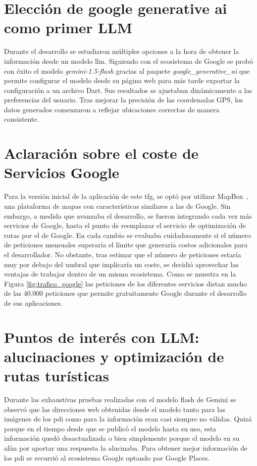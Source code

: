 \section{Elección de google generative ai como primer LLM}
Durante el desarrollo se estudiaron múltiples opciones a la hora de obtener la información desde un modelo \acrshort{llm}. 
Siguiendo con el ecosistema de Google se probó con éxito el modelo \textit{gemini-1.5-flash} gracias al paquete \textit{google\_generative\_ai} que permite configurar el modelo desde su página web para más tarde exportar la configuración a un archivo Dart. Sus resultados se ajustaban dinámicamente a las preferencias del usuario. Tras mejorar la precisión de las coordenadas GPS, los datos generados comenzaron a reflejar ubicaciones correctas de manera consistente.
\

\section{Aclaración sobre el coste de Servicios Google}
Para la versión inicial de la aplicación de este \acrshort{tfg}, se optó por utilizar MapBox~\cite{mapbox}, una plataforma de mapas con características similares a las de Google. Sin embargo, a medida que avanzaba el desarrollo, se fueron integrando cada vez más servicios de Google, hasta el punto de reemplazar el servicio de optimización de rutas por el de Google. En cada cambio se evaluaba cuidadosamente si el número de peticiones mensuales superaría el límite que generaría costos adicionales para el desarrollador. No obstante, tras estimar que el número de peticiones estaría muy por debajo del umbral que implicaría un coste, se decidió aprovechar las ventajas de trabajar dentro de un mismo ecosistema. Como se muestra en la Figura \ref{fig:trafico_google} las peticiones de los diferentes servicios distan mucho de las 40.000 peticiones que permite gratuitamente Google durante el desarrollo de sus aplicaciones.
  
\section{Puntos de interés con LLM: alucinaciones y optimización de rutas turísticas}
Durante las exhaustivas pruebas realizadas con el modelo flash de Gemini se observó que las direcciones web obtenidas desde el modelo tanto para las imágenes de los \acrshort{pdi} como para la información eran casi siempre no válidas. Quizá porque en el tiempo desde que se publicó el modelo hasta su uso, esta información quedó desactualizada o bien simplemente porque el modelo en su afán por aportar una respuesta la alucinaba.
Para obtener mejor información de los \acrlong{pdi} se recurrió al ecosistema Google optando por Google Places.

